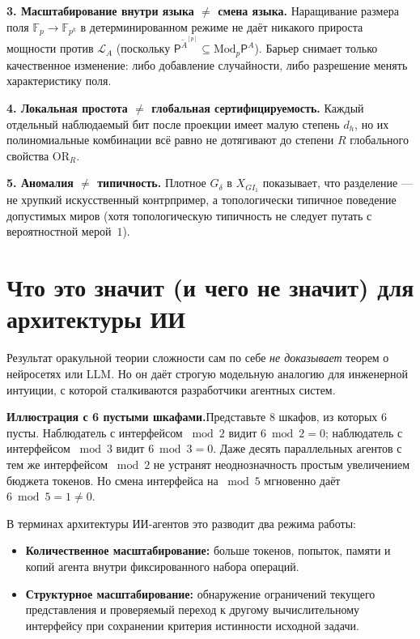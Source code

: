 \documentclass[11pt,a4paper]{article}
\newcommand{\Pcl}{\mathsf{P}}
\newcommand{\Modp}{\mathrm{Mod}_p\mathsf{P}}
\newcommand{\OR}{\mathrm{OR}}
\newcommand{\F}{\mathbb{F}}
\newcommand{\GI}{GI_1}
\newcommand{\callout}[2]{%
  \vspace{5pt}\noindent\colorbox{softbg}{%
    \parbox{\dimexpr\linewidth-2\fboxsep\relax}{%
      \vspace{4pt}\textbf{\color{primary}#1.}\hspace{0.45em}#2\vspace{4pt}%
    }%
  }\vspace{5pt}%
}
\begin{document}
\textbf{3. Масштабирование внутри языка $\ne$ смена языка.} Наращивание размера поля $\F_p \to \F_{p^k}$ в детерминированном режиме не даёт никакого прироста мощности против $\mathcal{L}_A$ (поскольку $\Pcl^{\widetilde{A}^{[p]}} \subseteq \Modp^A$). Барьер снимает только качественное изменение: либо добавление случайности, либо разрешение менять характеристику поля.

\textbf{4. Локальная простота $\ne$ глобальная сертифицируемость.} Каждый отдельный наблюдаемый бит после проекции имеет малую степень $d_h$, но их полиномиальные комбинации всё равно не дотягивают до степени $R$ глобального свойства $\OR_R$.

\textbf{5. Аномалия $\ne$ типичность.} Плотное $G_\delta$ в $X_{\GI}$ показывает, что разделение — не хрупкий искусственный контрпример, а топологически типичное поведение допустимых миров (хотя топологическую типичность не следует путать с вероятностной мерой~$1$).

\section{Что это значит (и чего не значит) для архитектуры ИИ}

Результат оракульной теории сложности сам по себе \emph{не доказывает} теорем о нейросетях или LLM. Но он даёт строгую модельную аналогию для инженерной интуиции, с которой сталкиваются разработчики агентных систем.

\callout{Иллюстрация с 6 пустыми шкафами}{Представьте 8 шкафов, из которых 6 пусты. Наблюдатель с интерфейсом $\bmod 2$ видит $6 \bmod 2 = 0$; наблюдатель с интерфейсом $\bmod 3$ видит $6 \bmod 3 = 0$. Даже десять параллельных агентов с тем же интерфейсом $\bmod 2$ не устранят неоднозначность простым увеличением бюджета токенов. Но смена интерфейса на $\bmod 5$ мгновенно даёт $6 \bmod 5 = 1 \ne 0$.}

В терминах архитектуры ИИ-агентов это разводит два режима работы:
\begin{itemize}
  \item \textbf{Количественное масштабирование:} больше токенов, попыток, памяти и копий агента внутри фиксированного набора операций.
  \item \textbf{Структурное масштабирование:} обнаружение ограничений текущего представления и проверяемый переход к другому вычислительному интерфейсу при сохранении критерия истинности исходной задачи.
\end{itemize}
\end{document}
